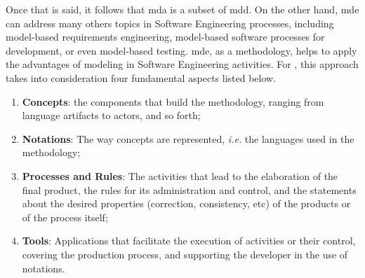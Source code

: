 Once that is said, it follows that \ac{mda} is a subset of \ac{mdd}.
On the other hand, \ac{mde} can address many others topics in Software Engineering processes, including model-based requirements engineering, model-based software processes for development, or even model-based testing.
\ac{mde}, as a methodology, helps to apply the advantages of modeling in Software Engineering activities.
For \cite{Brambilla:2017}, this approach takes into consideration four fundamental aspects listed below.


\begin{enumerate}
   \item \textbf{Concepts}: the components that build the methodology, ranging from language artifacts to actors, and so forth;
   \item \textbf{Notations}: The way concepts are represented, \textit{i.e.} the languages used in the methodology;
   \item \textbf{Processes and Rules}: The activities that lead to the elaboration of the final product, the rules for its administration and control, and the statements about the desired properties (correction, consistency, etc) of the products or of the process itself;
   \item \textbf{Tools}: Applications that facilitate the execution of activities or their control, covering the production process, and supporting the developer in the use of notations.
\end{enumerate}

